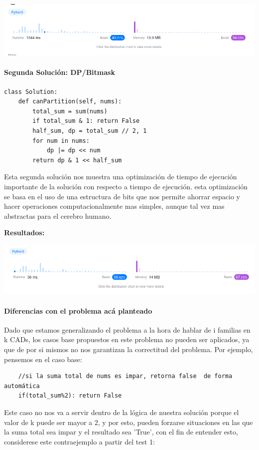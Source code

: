 \documentclass[a4paper]{article}
\begin{document}
\includegraphics[scale=0.7]{R1.png}

\paragraph{Segunda Solución: DP/Bitmask}
\begin{verbatim}
class Solution:
    def canPartition(self, nums):
        total_sum = sum(nums)
        if total_sum & 1: return False
        half_sum, dp = total_sum // 2, 1
        for num in nums:
            dp |= dp << num
        return dp & 1 << half_sum
\end{verbatim}

Esta segunda solución nos muestra una optimización de tiempo de ejecución importante
de la solución con respecto a tiempo de ejecución. esta optimización se basa en el uso
de una estructura de bits que nos permite ahorrar espacio y hacer operaciones computacionalmente
mas simples, aunque tal vez mas abstractas para el cerebro humano.

\textbf{Resultados:}

\includegraphics[scale=0.7]{R2.png}

\paragraph{Diferencias con el problema acá planteado}
Dado que estamos generalizando el problema a la hora de hablar de i familias en k CADs, los
casos base propuestos en este problema no pueden ser aplicados, ya que de por si mismos no 
nos garantizan la correctitud del problema. Por ejemplo, pensemos en el caso base:
\begin{verbatim}
    //si la suma total de nums es impar, retorna false  de forma automática
    if(total_sum%2): return False 
\end{verbatim}
Este caso no nos va a servir dentro de la lógica de nuestra solución porque el 
valor de k puede ser mayor a 2, y por esto, pueden forzarse situaciones en las que la suma total
sea impar y el resultado sea 'True', con el fin de entender esto, considerese este
contraejemplo a partir del test 1:
\end{document}
